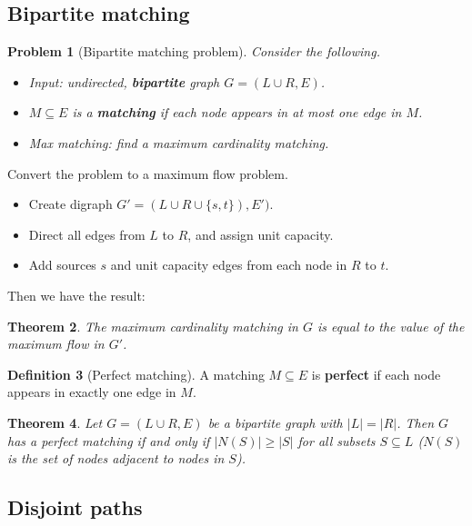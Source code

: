 \documentclass[10pt, oneside, reqno]{amsart}
\theoremstyle{plain}%
\newtheorem{thm}{Theorem}[section]
\newtheorem{prob}[thm]{Problem}
\theoremstyle{definition}
\newtheorem{defn}[thm]{Definition}
\theoremstyle{remark}
\begin{document}
\subsection{Bipartite matching} %
\label{sub:bipartite_matching}
\begin{prob}[Bipartite matching problem]
    Consider the following.
    \begin{itemize}
        \item Input: undirected, \textbf{bipartite} graph $G = (L \cup R, E)$.
        \item $M \subseteq E$ is a \textbf{matching} if each node appears in at most one edge in $M$.
        \item Max matching: find a maximum cardinality matching.
    \end{itemize}
\end{prob}

Convert the problem to a maximum flow problem.
\begin{itemize}
    \item Create digraph $G' = (L \cup R \cup \{s,t\}), E')$.
    \item Direct all edges from $L$ to $R$, and assign unit capacity.
    \item Add sources $s$ and unit capacity edges from each node in $R$ to $t$.
\end{itemize}

Then we have the result:
\begin{thm}
    The maximum cardinality matching in $G$ is equal to the value of the maximum flow in $G'$.
\end{thm}

\begin{defn}[Perfect matching]
    A matching $M \subseteq E$ is \textbf{perfect} if each node appears in exactly one edge in $M$.
\end{defn}

\begin{thm}
    Let $G = (L \cup R, E)$ be a bipartite graph with $|L| = |R|$.  Then $G$ has a perfect matching if and only if $|N(S)| \geq |S|$ for all subsets $S \subseteq L$ ($N(S)$ is the set of nodes adjacent to nodes in $S$).
\end{thm}


\subsection{Disjoint paths} %
\label{sub:disjoint_paths}
\end{document}
